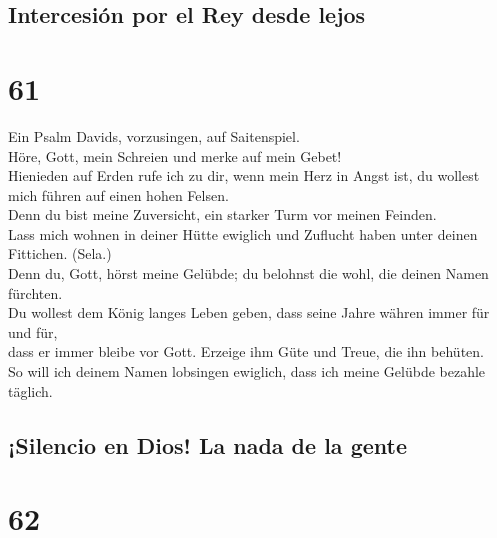 \hypertarget{intercesiuxf3n-por-el-rey-desde-lejos}{%
\subsection{Intercesión por el Rey desde
lejos}\label{intercesiuxf3n-por-el-rey-desde-lejos}}

\hypertarget{section-60}{%
\section{61}\label{section-60}}

 Ein Psalm Davids, vorzusingen, auf Saitenspiel.\\
 Höre, Gott, mein Schreien und merke auf mein Gebet!\\
 Hienieden auf Erden rufe ich zu dir, wenn mein Herz in
Angst ist, du wollest mich führen auf einen hohen Felsen.\\
 Denn du bist meine Zuversicht, ein starker Turm vor
meinen Feinden.\\
 Lass mich wohnen in deiner Hütte ewiglich und Zuflucht
haben unter deinen Fittichen. (Sela.)\\
 Denn du, Gott, hörst meine Gelübde; du belohnst die wohl,
die deinen Namen fürchten.\\
 Du wollest dem König langes Leben geben, dass seine Jahre
währen immer für und für,\\
 dass er immer bleibe vor Gott. Erzeige ihm Güte und
Treue, die ihn behüten.\\
 So will ich deinem Namen lobsingen ewiglich, dass ich
meine Gelübde bezahle täglich.

\hypertarget{silencio-en-dios-la-nada-de-la-gente}{%
\subsection{¡Silencio en Dios! La nada de la
gente}\label{silencio-en-dios-la-nada-de-la-gente}}

\hypertarget{section-61}{%
\section{62}\label{section-61}}

